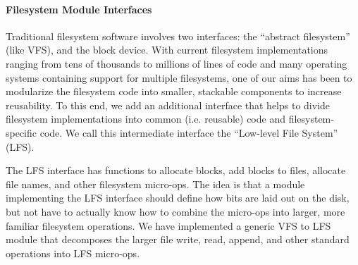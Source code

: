 \preparagraphspacing{}
\paragraph{Filesystem Module Interfaces}
\label{sec:interfaces}

Traditional filesystem software involves two interfaces: the ``abstract
filesystem'' (like VFS), and the block device. With current filesystem
implementations ranging from tens of thousands to millions of lines of code
and many operating systems containing support for multiple filesystems, one of
our aims has been to modularize the filesystem code into smaller, stackable
components to increase reusability. To this end, we add an additional
interface that helps to divide filesystem implementations into common (i.e.
reusable) code and filesystem-specific code. We call this intermediate
interface the ``Low-level File System'' (LFS).

The LFS interface has functions to allocate blocks, add blocks to files,
allocate file names, and other filesystem micro-ops. The idea is that a module
implementing the LFS interface should define how bits are laid out on the
disk, but not have to actually know how to combine the micro-ops into larger,
more familiar filesystem operations. We have implemented a generic VFS to LFS
module that decomposes the larger file write, read, append, and other standard
operations into LFS micro-ops.
